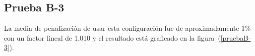
\subsection{Prueba B-3}

La media de penalización de usar esta configuración fue de aproximadamente 1\% con un factor lineal de 1.010 y el resultado está graficado en la figura~(\ref{pruebaB-3}).




